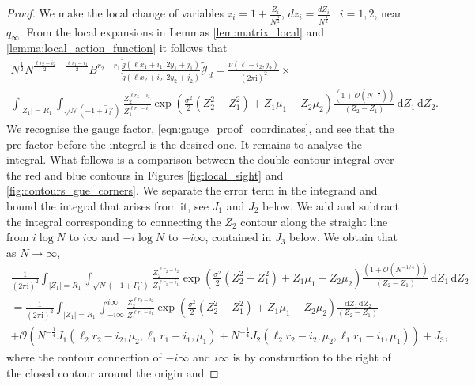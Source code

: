 \documentclass[11pt]{article}
\theoremstyle{plain}
\theoremstyle{definition}
\numberwithin{equation}{section}
\renewcommand{\d}{\,\mathrm{d}}
\renewcommand{\i}{\mathrm{i}}
\begin{document}
\begin{proof}
We make the local change of variables $z_i=1+\frac{Z_i}{N^\frac{1}{2}}$, $dz_i=\frac{dZ_i}{N^{\frac{1}{2}}}$ ~$i=1,2$, near $q_{\infty}$.
From the local expansions in Lemmas \ref{lem:matrix_local} and \ref{lemma:local_action_function} it follows that 
\begin{multline*}
%
%
%
N^{\frac{1}{2}}N^{\frac{\ell r_2-i_2}{2}-\frac{\ell r_1-i_1}{2}}
 B^{r_2-r_1}
\frac{\tilde g(\ell x_1+i_1,2y_1+j_1)}{\tilde g(\ell x_2+i_2,2y_2+j_2)}
\mathcal{\widetilde{J}}_d
=
%
%
%
\frac{\nu(\ell-i_2,j_2)}{(2\pi\i)^2}
\times
\\
\int_{|Z_1|=R_1}
\int_{\sqrt{N}(-1+\widetilde{\Gamma}_l')}
\frac{Z_2^{\ell r_2-i_2}}{Z_1^{\ell r_1-i_1}}\exp\left(\frac{\sigma^2}{2}(Z_2^2-Z_1^2)+Z_1\mu_1-Z_2\mu_2\right)
\frac{\left(1+\mathcal{O}(N^{-\frac{1}{4}})\right)}{(Z_2-Z_1)}
\d Z_1\d Z_2.
\end{multline*}
We recognise the gauge factor, \eqref{eqn:gauge_proof_coordinates}, and see that the pre-factor before the integral is the desired one. It remains to analyse the integral.
What follows is a comparison between the double-contour integral over the red and blue contours in Figures \ref{fig:local_sight} and \ref{fig:contours_gue_corners}.
 We separate the error term in the integrand and bound the integral that arises from it, see $J_1$ and $J_2$ below. We add and subtract the integral corresponding to connecting the $Z_2$ contour
 along the straight line from $i\log{N}$ to $i\infty$ and $-i\log N$ to $-i\infty$, contained in $J_3$ below. We obtain that as $N\rightarrow\infty$,
%
%
%
\begin{multline}\label{eqn:decomposition_local_computation}
\frac{1}{(2\pi\i)^2}\int_{|Z_1|=R_1}
\int_{\sqrt{N}(-1+\Gamma_l')}
\frac{Z_2^{\ell r_2-i_2}}{Z_1^{\ell r_1-i_1}}\exp\left(\frac{\sigma^2}{2}(Z_2^2-Z_1^2)+Z_1\mu_1-Z_2\mu_2\right)
\frac{\left(1+\mathcal{O}(N^{-1/4})\right)}{(Z_2-Z_1)}
\d Z_1\d Z_2
\\=
\frac{1}{(2\pi\i)^2}\int_{|Z_1|=R_1}
\int_{-i\infty}^{i\infty}
\frac{Z_2^{\ell r_2-i_2}}{Z_1^{\ell r_1-i_1}}\exp{\left(\frac{\sigma^2}{2}(Z_2^2-Z_1^2)+Z_1\mu_1-Z_2\mu_2\right)}
\frac{\d Z_1\d Z_2}{(Z_2-Z_1)}
\\+ \mathcal{O}\left(N^{-\frac{1}{4}}J_1(\ell_2 r_2-i_2, \mu_2, \ell_1r_1-i_1, \mu_1)+N^{-\frac{1}{4}}J_2(\ell_2 r_2-i_2, \mu_2, \ell_1r_1-i_1, \mu_1)\right)
+J_3,
\end{multline}
where the contour connection of $-i\infty$ and $i\infty$ is by construction to the right of the closed contour around the origin and

\end{proof}
\end{document}
